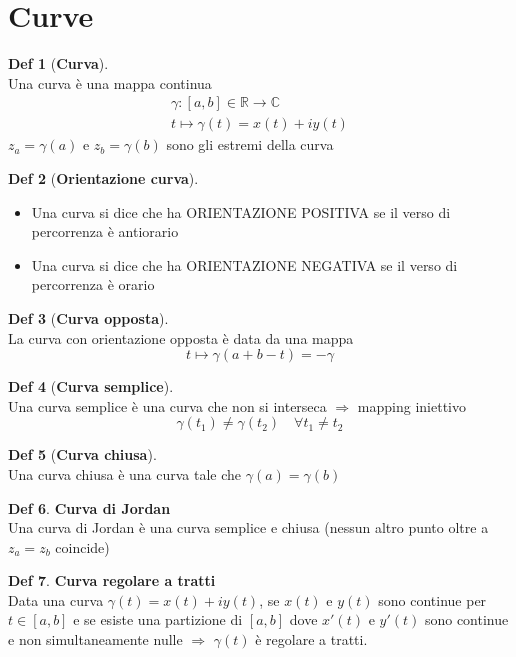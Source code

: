 \documentclass[a4paper,11pt]{report}
\theoremstyle{remark}
\theoremstyle{definition}
\newtheorem*{Def}{Def}
\begin{document}
	\section{Curve}
	\begin{Def}[\textbf{Curva}] \hfil\\
		Una curva è una mappa continua 
			\begin{gather*}
				\gamma:[a,b] \in \mathbb{R} \rightarrow \mathbb{C} \\
				t \mapsto \gamma(t)= x(t) +iy(t)
			\end{gather*}	
		$z_a = \gamma(a) \mbox{ e } z_b=\gamma(b)$ sono gli estremi della curva 
	\end{Def}
	\begin{Def}[\textbf{Orientazione curva}] \hfil
		\begin{itemize}
			\item Una curva si dice che ha ORIENTAZIONE POSITIVA se il verso di percorrenza è antiorario
			\item Una curva si dice che ha ORIENTAZIONE NEGATIVA se il verso di percorrenza è orario
		\end{itemize}
	\end{Def}
	\begin{Def}[\textbf{Curva opposta}]\hfil\\
		La curva con orientazione opposta è data da una mappa 
		\[t \mapsto \gamma(a+b-t)=-\gamma\]
	\end{Def}
	\begin{Def}[\textbf{Curva semplice}]\hfil\\
		Una curva semplice è una curva che non si interseca $\Rightarrow$ mapping iniettivo
		\[\gamma(t_1)\neq\gamma(t_2) \quad \forall t_1\neq t_2\]
	\end{Def}
	\begin{Def}[\textbf{Curva chiusa}]\hfil\\
		Una curva chiusa è una curva tale che $\gamma(a)=\gamma(b)$ 
	\end{Def}
		\begin{Def}{\textbf{Curva di Jordan}}\hfil\\
		Una curva di Jordan è una curva semplice e chiusa (nessun altro punto oltre a $z_a=z_b$ coincide)
	\end{Def}
	\begin{Def}{\textbf{Curva regolare a tratti}}\hfill\\
		Data una curva $\gamma(t)=x(t)+iy(t)$, se $x(t) \mbox{ e } y(t)$ sono continue per $t\in[a,b]$ e se esiste una partizione di $[a,b]$ dove $x'(t) \mbox{ e } y'(t)$ sono continue e non simultaneamente nulle $\Rightarrow$ $\gamma(t)$ è regolare a tratti.
	\end{Def} 
\end{document}
